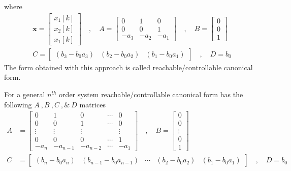 \documentclass[twoside]{article}
\begin{document}
%
where 
%
\begin{align*}
\mathbf{x} = \left[ \begin{array}{c} x_1[k] \\ x_2[k] \\
x_1[k] \end{array} \right] \quad , \quad
A = \left[ \begin{array}{ccc} 0 & 1 & 0 \\ 0 & 0 & 1
    \\ -a_3 & -a_2 & -a_1 \end{array} \right]
\quad , \quad 
B = \left[ \begin{array}{c} 0\\ 0 
    \\ 1 \end{array} \right]
\\ C = \left[ \begin{array}{ccc} (b_3 - b_0 a_3) &  (b_2 - b_0 a_2) &
   (b_1 - b_0 a_1) \end{array} \right]
\quad , \quad
D = b_0
\end{align*}
%
The form obtained with this approach is called
reachable/controllable canonical form. 

For a general $n^{th}$ order system reachable/controllable
canonical form has the following $A \ ,  B \ ,  C \ , \& \ D$
matrices
%
\begin{align*}
A &= \left[ \begin{array}{ccccc} 0 & 1 & 0 & \cdots & 0 \\ 0 & 0 & 1 &
                                                          \cdots & 0
\\ \vdots & \vdots & \vdots & & \vdots
\\ 0 & 0 & 0 & \cdots & 1
    \\ -a_n & -a_{n-1} & -a_{n-2} & \cdots & -a_1 \end{array} \right]
\quad , \quad 
B = \left[ \begin{array}{c} 0\\ 0 \\ \vdots \\ 0
    \\ 1 \end{array} \right]
\\ C &= \left[ \begin{array}{ccccc} (b_n - b_0 a_n) 
  &  (b_{n-1} - b_0 a_{n-1}) & \cdots &  (b_2 - b_0 a_2) &
   (b_1 - b_0 a_1) \end{array} \right]
\quad , \quad
D = b_0
\end{align*}
\end{document}
